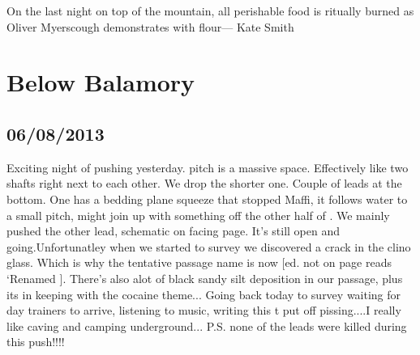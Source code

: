 




\begin{marginfigure}
\centering
{}
\label{Olifire}
\caption{On the last night on top of the mountain, all perishable food is ritually burned as Oliver Myerscough demonstrates with flour--- Kate Smith}
\end{marginfigure}

\section{Below Balamory}

    
\subsection{06/08/2013}
Exciting night of pushing yesterday.  pitch is a massive space. Effectively like two shafts right next to each other. We drop the shorter one. Couple of leads at the bottom. One has a bedding plane squeeze that stopped Maffi, it follows water to a small pitch, might join up with something off the other half of .
We mainly pushed the other lead, schematic on facing page. It's still open and going.Unfortunatley when we started to survey we discovered a crack in the clino glass. Which is why the tentative passage name is now  [ed. not on page reads `Renamed ]. There's also alot of black sandy silt deposition in our passage, plus its in keeping with the cocaine theme...
Going back today to survey waiting for day trainers to arrive, listening to music, writing this t put off pissing....I really like caving and camping underground...
P.S. none of the leads were killed during this push!!!!

